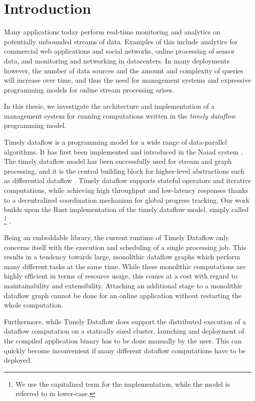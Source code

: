 \chapter{Introduction}\label{ch:introduction}

Many applications today perform real-time monitoring and analytics on
potentially unbounded streams of data. Examples of this include analytics for
commercial web applications and social networks, online processing of sensor
data, and monitoring and networking in datacenters. In many deployments however,
the number of data sources and the amount and complexity of queries will increase
over time, and thus the need for management systems and expressive programming
models for online stream processing arises.

\vspace{0.66em}
In this thesis, we investigate the architecture and implementation of a
management system for running computations written in the \emph{timely
dataflow} programming model.
\vspace{0.66em}

Timely dataflow is a programming model for a wide range of data-parallel algorithms.
It has first been implemented and introduced in the Naiad system \cite{naiad}.
The timely dataflow model has been successfully used for stream and graph
processing, and it is the central building block for
higher-level abstractions such as differential dataflow \cite{differential}.
Timely dataflow supports stateful operators and iterative computations, while
achieving high throughput and low-latency responses thanks to a decentralized
coordination mechanism for global progress tracking. Our work
builds upon the Rust implementation of the timely dataflow model,
simply called \footnote{We use the capitalized term
for the implementation, while the model is referred to in lower-case.} \cite{timely}.

Being an embeddable library, the current runtime of Timely Dataflow only
concerns itself with the execution and scheduling of a single processing job.
This results in a tendency towards large, monolithic dataflow graphs which
perform many different tasks at the same time. While these monolithic computations
are highly efficient in terms of resource usage, this comes at a cost with regard
to maintainability and extensibility. Attaching an additional stage to a monolithic
dataflow graph cannot be done for an online application without restarting the
whole computation.

Furthermore, while Timely Dataflow does support the distributed execution of
a dataflow computation on a statically sized cluster, launching and deployment
of the compiled application binary has to be done manually by the user. This
can quickly become inconvenient if many different dataflow computations have
to be deployed.

